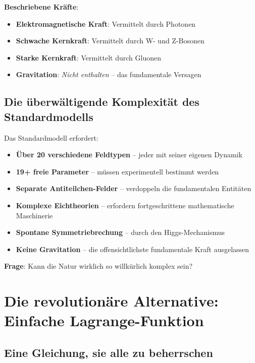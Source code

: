 \documentclass[12pt,a4paper]{article}
\theoremstyle{definition}
\theoremstyle{remark}
\begin{document}
	\textbf{Beschriebene Kräfte}:
	\begin{itemize}
		\item \textbf{Elektromagnetische Kraft}: Vermittelt durch Photonen
		\item \textbf{Schwache Kernkraft}: Vermittelt durch W- und Z-Bosonen
		\item \textbf{Starke Kernkraft}: Vermittelt durch Gluonen
		\item \textbf{Gravitation}: \emph{Nicht enthalten} -- das fundamentale Versagen
	\end{itemize}
	
	\subsection{Die überwältigende Komplexität des Standardmodells}
	
	\begin{tcolorbox}[colback=red!5!white,colframe=red!75!black,title=Standardmodell-Komplexitätskrise]
		Das Standardmodell erfordert:
		\begin{itemize}
			\item \textbf{Über 20 verschiedene Feldtypen} -- jeder mit seiner eigenen Dynamik
			\item \textbf{19+ freie Parameter} -- müssen experimentell bestimmt werden
			\item \textbf{Separate Antiteilchen-Felder} -- verdoppeln die fundamentalen Entitäten
			\item \textbf{Komplexe Eichtheorien} -- erfordern fortgeschrittene mathematische Maschinerie
			\item \textbf{Spontane Symmetriebrechung} -- durch den Higgs-Mechanismus
			\item \textbf{Keine Gravitation} -- die offensichtlichste fundamentale Kraft ausgelassen
		\end{itemize}
		
		\textbf{Frage}: Kann die Natur wirklich so willkürlich komplex sein?
	\end{tcolorbox}
	
	\section{Die revolutionäre Alternative: Einfache Lagrange-Funktion}
	
	\subsection{Eine Gleichung, sie alle zu beherrschen}
	
\end{document}
